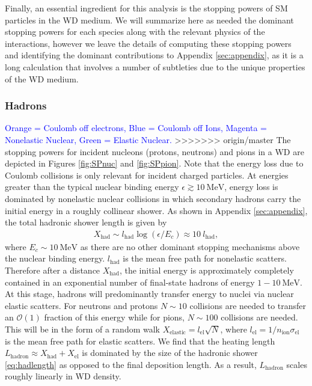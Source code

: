 \documentclass[twocolumn,showpacs,preprintnumbers,amsmath,amssymb,prd]{revtex4}
\newcommand{\OO}{\mathcal{O}}
\begin{document}
Finally, an essential ingredient for this analysis is the stopping powers of SM particles in the WD medium. 
We will summarize here as needed the dominant stopping powers for each species along with the relevant physics of the interactions, however we leave the details of computing these stopping powers and identifying the dominant contributions to Appendix \ref{sec:appendix}, as it is a long calculation that involves a number of subtleties due to the unique properties of the WD medium.

\subsubsection{Hadrons}
\textcolor{blue}{Orange = Coulomb off electrons, Blue = Coulomb off Ions, Magenta = Nonelastic Nuclear, Green = Elastic Nuclear.}
>>>>>>> origin/master
The stopping powers for incident nucleons (protons, neutrons) and pions in a WD are depicted in Figures \ref{fig:SPnuc} and \ref{fig:SPpion}.
Note that the energy loss due to Coulomb collisions is only relevant for incident charged particles.
At energies greater than the typical nuclear binding energy $\epsilon \gtrsim 10 ~\text{MeV}$, energy loss is dominated by nonelastic nuclear collisions in which secondary hadrons carry the initial energy in a roughly collinear shower.
As shown in Appendix \ref{sec:appendix}, the total hadronic shower length is given by
\begin{align}
\label{eq:hadlength}
X_{\text{had}} \sim l_\text{had} \log{(\epsilon/E_c)} \approx 10 ~l_\text{had},
\end{align}
where $E_c \sim 10 ~\text{MeV}$ as there are no other dominant stopping mechanisms above the nuclear binding energy.
$l_\text{had}$ is the mean free path for nonelastic scatters.
Therefore after a distance $X_\text{had}$, the initial energy is approximately completely contained in an exponential number of final-state hadrons of energy $1 - 10 ~\text{MeV}$.
At this stage, hadrons will predominantly transfer energy to nuclei via nuclear elastic scatters.
For neutrons and protons $N \sim 10$ collisions are needed to transfer an $\OO(1)$ fraction of this energy while for pions, $N \sim 100$ collisions are needed.
This will be in the form of a random walk $X_\text{elastic} = l_\text{el} \sqrt{N}$, where $ l_\text{el} = 1/n_\text{ion} \sigma_\text{el}$ is the mean free path for elastic scatters.
We find that the heating length $L_\text{hadron} \approx X_\text{had} + X_\text{el}$ is dominated by the size of the hadronic shower \eqref{eq:hadlength} as opposed to the final deposition length.
As a result, $L_\text{hadron}$ scales roughly linearly in WD density.
\end{document}

